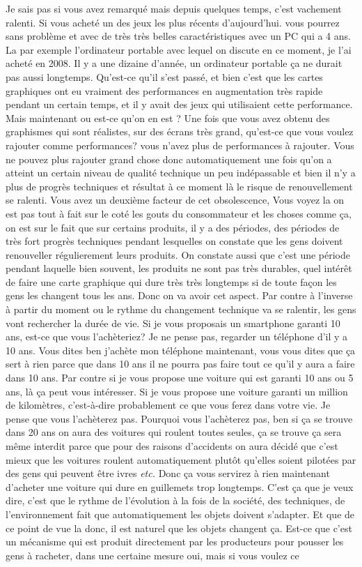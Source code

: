 \begin{small}
Je sais pas si vous avez remarqué mais depuis quelques temps, c'est vachement ralenti. Si vous acheté un des jeux les plus récents d'aujourd'hui. vous pourrez sans problème et avec de très très belles caractéristiques avec un PC qui a 4 ans. La par exemple l'ordinateur portable avec lequel on discute en ce moment, je l'ai acheté en 2008. Il y a une dizaine d'année, un ordinateur portable ça ne durait pas aussi longtemps. Qu'est-ce qu'il s'est passé, et bien c'est que les cartes graphiques ont eu vraiment des performances en augmentation très rapide pendant un certain temps, et il y avait des jeux qui utilisaient cette performance. Mais maintenant ou est-ce qu'on en est ? Une fois que vous avez obtenu des graphismes qui sont réalistes, sur des écrans très grand, qu'est-ce que vous voulez rajouter comme performances? vous n'avez plus de performances à rajouter. Vous ne pouvez plus rajouter grand chose donc automatiquement une fois qu'on a atteint un certain niveau de qualité technique un peu indépassable et bien il n'y a plus de progrès techniques et résultat à ce moment là le risque de renouvellement se ralenti. Vous avez un deuxième facteur de cet obsolescence, Vous voyez la on est pas tout à fait sur le coté les gouts du consommateur et les choses comme ça, on est sur le fait que sur certains produits, il y a des périodes, des périodes de très fort progrès techniques pendant lesquelles on constate que les gens doivent renouveller régulierement leurs produits. On constate aussi que c'est une période pendant laquelle bien souvent, les produits ne sont pas très durables, quel intérêt de faire une carte graphique qui dure très très longtemps si de toute façon les gens les changent tous les ans. Donc on va avoir cet aspect. Par contre à l'inverse à partir du moment ou le rythme du changement technique va se ralentir, les gens vont rechercher la durée de vie. Si je vous proposais un smartphone garanti 10 ans, est-ce que vous l'achèteriez? Je ne pense pas, regarder un téléphone d'il y a 10 ans. Vous dites ben j'achète mon téléphone maintenant, vous vous dites que ça sert à rien parce que dans 10 ans il ne pourra pas faire tout ce qu'il y aura a faire dans 10 ans. Par contre si je vous propose une voiture qui est garanti 10 ans ou 5 ans, là ça peut vous intéresser. Si je vous propose une voiture garanti un million de kilomètres, c'est-à-dire probablement ce que vous ferez dans votre vie. Je pense que vous l'achèterez pas. Pourquoi vous l'achèterez pas, ben si ça se trouve dans 20 ans on aura des voitures qui roulent toutes seules, ça se trouve ça sera même interdit parce que pour des raisons d'accidents on aura décidé que c'est mieux que les voitures roulent automatiquement plutôt qu'elles soient pilotées par des gens qui peuvent être ivres \textit{etc.} Donc ça vous servirez à rien maintenant d'acheter une voiture qui dure en guillemets trop longtemps. C'est ça que je veux dire, c'est que le rythme de l'évolution à la fois de la société, des techniques, de l'environnement fait que automatiquement les objets doivent s'adapter. Et que de ce point de vue la donc, il est naturel que les objets changent ça. Est-ce que c'est un mécanisme qui est produit directement par les producteurs pour pousser les gens à racheter, dans une certaine mesure oui, mais si vous voulez ce 
\end{small}
